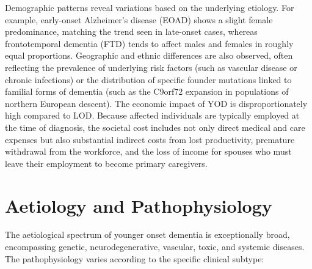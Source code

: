 Demographic patterns reveal variations based on the underlying etiology. For example, early-onset Alzheimer's disease (EOAD) shows a slight female predominance, matching the trend seen in late-onset cases, whereas frontotemporal dementia (FTD) tends to affect males and females in roughly equal proportions. Geographic and ethnic differences are also observed, often reflecting the prevalence of underlying risk factors (such as vascular disease or chronic infections) or the distribution of specific founder mutations linked to familial forms of dementia (such as the C9orf72 expansion in populations of northern European descent). The economic impact of YOD is disproportionately high compared to LOD. Because affected individuals are typically employed at the time of diagnosis, the societal cost includes not only direct medical and care expenses but also substantial indirect costs from lost productivity, premature withdrawal from the workforce, and the loss of income for spouses who must leave their employment to become primary caregivers.

\section*{Aetiology and Pathophysiology}
The aetiological spectrum of younger onset dementia is exceptionally broad, encompassing genetic, neurodegenerative, vascular, toxic, and systemic diseases. The pathophysiology varies according to the specific clinical subtype:

